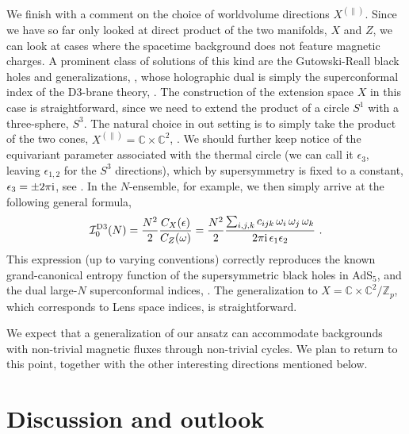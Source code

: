 \documentclass[11pt,a4paper]{article}
\def\cI{{\cal I}}
\def\i{{\rm i}}
\theoremstyle{definition}
\theoremstyle{identity}
\theoremstyle{remark}
\newcommand{\be}{\begin{equation}}
\newcommand{\ee}{\end{equation}}
\newcommand{\e}{\epsilon}
\newcommand{\BC}{\mathbb{C}}
\begin{document}
We finish with a comment on the choice of worldvolume directions $X^{(\parallel)}$. Since we have so far only looked at direct product of the two manifolds, $X$ and $Z$, we can look at cases where the spacetime background does not feature magnetic charges. A prominent class of solutions of this kind are the Gutowski-Reall black holes and generalizations, \cite{Gutowski:2004yv,Chong:2005hr,Kunduri:2006ek}, whose holographic dual is simply the superconformal index of the D3-brane theory, \cite{Kinney:2005ej,Romelsberger:2005eg}. The construction of the extension space $X$ in this case is straightforward, since we need to extend the product of a circle $S^1$ with a three-sphere, $S^3$. The natural choice in out setting is to simply take the product of the two cones, $X^{(\parallel)} = \BC \times \BC^2$, \cite{Cassani:2024tvk,Hristov:2026tde}. We should further keep notice of the equivariant parameter associated with the thermal circle (we can call it $\e_3$, leaving $\e_{1,2}$ for the $S^3$ directions), which by supersymmetry is fixed to a constant, $\e_3 = \pm 2 \pi \i$, see \cite{Cassani:2024tvk}. In the $N$-ensemble, for example, we then simply arrive at the following general formula,
\be
\cI_0^{\rm D3}(N)
=
\frac{N^2}{2}
\frac{C_X(\e)}{C_Z (\omega)} = \frac{N^2}{2}
\frac{\sum_{i, j, k} c_{i j k}\, \omega_i\, \omega_j\, \omega_k}{2 \pi \i\, \e_1 \e_2}\ .
\ee
This expression (up to varying conventions) correctly reproduces the known grand-canonical entropy function of the supersymmetric black holes in AdS$_5$, and the dual large-$N$ superconformal indices, \cite{Hosseini:2017mds,Cabo-Bizet:2018ehj,Choi:2018hmj,Benini:2018ywd}. The generalization to $X = \BC \times \BC^2/\mathbb{Z}_p$, which corresponds to Lens space indices, is straightforward.

We expect that a generalization of our ansatz can accommodate backgrounds with non-trivial magnetic fluxes through non-trivial cycles. We plan to return to this point, together with the other interesting directions mentioned below.



\section{Discussion and outlook}
\label{sec:discussion}
\end{document}
